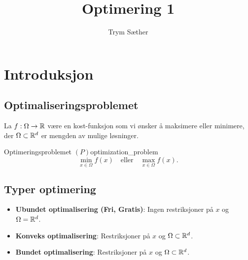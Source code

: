 \documentclass[10pt, a4paper]{report}
\begin{document}
\title{Optimering 1}

\author{Trym Sæther}

\maketitle

\tableofcontents

\newpage

\chapter{Introduksjon}

\section{Optimaliseringsproblemet}

La \(f: \Omega \to \mathbb{R}\) være en kost-funksjon som vi ønsker å maksimere eller minimere, der \(\Omega \subset \mathbb{R}^d\) er mengden av mulige løsninger.

\begin{definition}{Optimeringsproblemet \((P)\)}{optimization_problem}
  \[
    \min_{x \in \Omega} f(x) \quad \text{eller} \quad \max_{x \in \Omega} f(x).
  \]

\end{definition}

\section*{Typer optimering}

\begin{itemize}
  \item \textbf{Ubundet optimalisering (Fri, Gratis)}: Ingen restriksjoner på \(x\) og \(\Omega = \mathbb{R}^d\).
  \item \textbf{Konveks optimalisering}: Restriksjoner på \(x\) og \(\Omega \subset \mathbb{R}^d\).
  \item \textbf{Bundet optimalisering}: Restriksjoner på \(x\) og \(\Omega \subset \mathbb{R}^d\).
\end{itemize}








\end{document}
